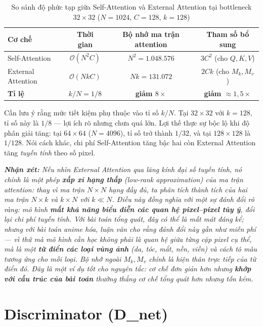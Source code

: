 \begin{table}[H]
\caption{So sánh độ phức tạp giữa Self-Attention và External Attention tại bottleneck $32\times32$ ($N = 1024$, $C = 128$, $k = 128$)}
\label{tab:attention_complexity}
\centering
\begin{tabular}{|l|c|c|c|}
\hline
\textbf{Cơ chế} & \textbf{Thời gian} & \textbf{Bộ nhớ ma trận attention} & \textbf{Tham số bổ sung} \\
\hline
Self-Attention \cite{Zhang2019} & $\mathcal{O}(N^2 C)$ & $N^2 = 1.048.576$ & $3C^2$ (cho $Q,K,V$) \\
\hline
External Attention \cite{Guo2021} & $\mathcal{O}(N k C)$ & $N k = 131.072$ & $2Ck$ (cho $M_k, M_v$) \\
\hline
\textbf{Tỉ lệ} & $k/N = 1/8$ & \textbf{giảm $8\times$} & \textbf{giảm $\approx 1{,}5\times$} \\
\hline
\end{tabular}
\end{table}

Cần lưu ý rằng mức tiết kiệm phụ thuộc vào tỉ số $k/N$. Tại $32\times32$ với $k=128$, tỉ số này là $1/8$ --- lợi ích rõ nhưng chưa quá lớn. Lợi thế thực sự bộc lộ khi độ phân giải tăng: tại $64\times64$ ($N = 4096$), tỉ số trở thành $1/32$, và tại $128\times128$ là $1/128$. Nói cách khác, chi phí Self-Attention tăng bậc hai còn External Attention tăng \textit{tuyến tính} theo số pixel.

\medskip
\noindent\textit{\textbf{Nhận xét:} Nếu nhìn External Attention qua lăng kính đại số tuyến tính, nó chính là một phép \textbf{xấp xỉ hạng thấp} (low-rank approximation) của ma trận attention: thay vì ma trận $N \times N$ hạng đầy đủ, ta phân tích thành tích của hai ma trận $N \times k$ và $k \times N$ với $k \ll N$. Điều này đồng nghĩa với một sự đánh đổi rõ ràng: mô hình \textbf{mất khả năng biểu diễn các quan hệ pixel--pixel tùy ý}, đổi lại chi phí tuyến tính. Với bài toán tổng quát, đây có thể là mất mát đáng kể; nhưng với bài toán anime hóa, luận văn cho rằng đánh đổi này gần như miễn phí --- vì thứ mà mô hình cần học không phải là quan hệ giữa từng cặp pixel cụ thể, mà là một \textbf{từ điển các loại vùng ảnh} (da, tóc, mắt, nền, viền) và cách tô màu tương ứng cho mỗi loại. Bộ nhớ ngoài $M_k, M_v$ chính là hiện thân trực tiếp của từ điển đó. Đây là một ví dụ tốt cho nguyên tắc: cơ chế đơn giản hơn nhưng \textbf{khớp với cấu trúc của bài toán} thường thắng cơ chế tổng quát hơn nhưng tốn kém.}

\section{Discriminator (D\_net)}
\label{sec:discriminator}


